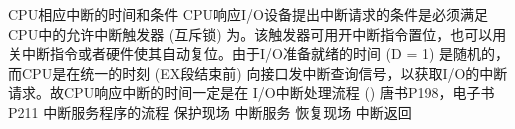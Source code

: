 \markdownRendererOlBeginTight
{}CPU相应中断的时间和条件 CPU响应I/O设备提出中断请求的条件是必须满足CPU中的允许中断触发器 (互斥锁) 为。该触发器可用开中断指令置位，也可以用关中断指令或者硬件使其自动复位。由于I/O准备就绪的时间 (D = 1) 是随机的，而CPU是在统一的时刻 (EX段结束前) 向接口发中断查询信号，以获取I/O的中断请求。故CPU响应中断的时间一定是在\markdownRendererOlItemEnd 
{}I/O中断处理流程 () 唐书P198，电子书P211\markdownRendererOlItemEnd 
{}中断服务程序的流程\markdownRendererOlItemEnd 
{}保护现场\markdownRendererOlItemEnd 
{}中断服务\markdownRendererOlItemEnd 
{}恢复现场\markdownRendererOlItemEnd 
{}中断返回\markdownRendererOlItemEnd 
\markdownRendererOlEndTight \relax